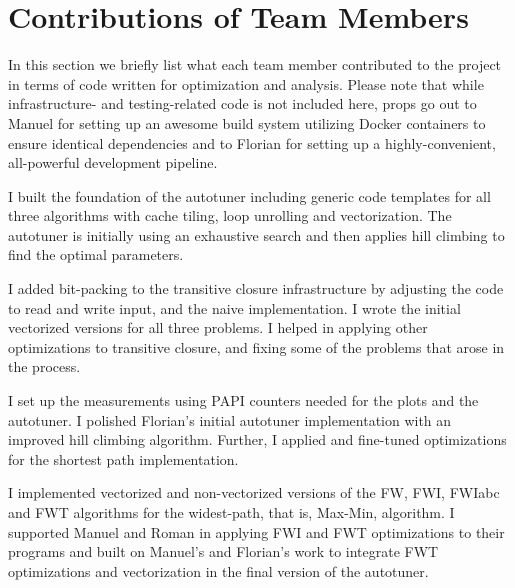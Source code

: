 \section{Contributions of Team Members}

In this section we briefly list what each team member contributed to the project in terms of code written for optimization and analysis. Please note that while infrastructure- and testing-related code is not included here, props go out to Manuel for setting up an awesome build system utilizing Docker containers to ensure identical dependencies and to Florian for setting up a highly-convenient, all-powerful development pipeline.

 I built the foundation of the autotuner including generic code templates for all three algorithms with cache tiling, loop unrolling and vectorization. The autotuner is initially using an exhaustive search and then applies hill climbing to find the optimal parameters.

I added bit-packing to the transitive closure infrastructure by adjusting the code to read and write input, and the naive implementation. I wrote the initial vectorized versions for all three problems. I helped in applying other optimizations to transitive closure, and fixing some of the problems that arose in the process.

 I set up the measurements using PAPI counters needed for the plots and the autotuner. I polished Florian's initial autotuner implementation with an improved hill climbing algorithm. Further, I applied and fine-tuned optimizations for the shortest path implementation.

 I implemented vectorized and non-vectorized versions of the FW, FWI, FWIabc and FWT algorithms for the widest-path, that is, Max-Min, algorithm. I supported Manuel and Roman in applying FWI and FWT optimizations to their programs and built on Manuel's and Florian's work to integrate FWT optimizations and vectorization in the final version of the autotuner.

